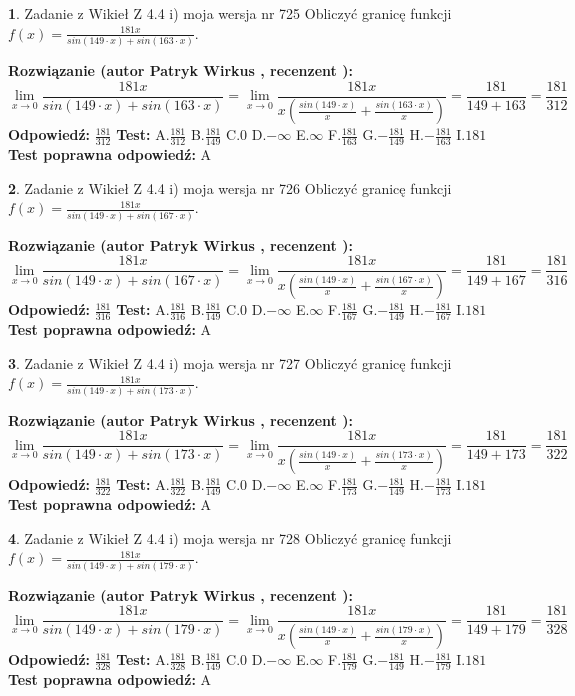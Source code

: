 \documentclass[12pt, a4paper]{article}
\theoremstyle{definition} %
\newtheorem{zad}{}
\newcommand{\zadStart}[1]{\begin{zad}#1\newline}
\newcommand{\zadStop}{\end{zad}}
\newcommand{\rozwStart}[2]{\noindent \textbf{Rozwiązanie (autor #1 , recenzent #2): }\newline}
\newcommand{\rozwStop}{\newline}
\newcommand{\odpStart}{\noindent \textbf{Odpowiedź:}\newline}
\newcommand{\odpStop}{\newline}
\newcommand{\testStart}{\noindent \textbf{Test:}\newline}
\newcommand{\testStop}{\newline}
\newcommand{\kluczStart}{\noindent \textbf{Test poprawna odpowiedź:}\newline}
\newcommand{\kluczStop}{\newline}
\begin{document}
\zadStart{Zadanie z Wikieł Z 4.4 i) moja wersja nr 725}
Obliczyć granicę funkcji $f(x)=\frac{181x}{sin(149\cdot x) +sin(163\cdot x)}$.
\zadStop
\rozwStart{Patryk Wirkus}{}
$$\lim\limits_{x\to 0}\frac{181x}{sin(149\cdot x) +sin(163\cdot x)}=\lim\limits_{x\to 0}\frac{181x}{x(\frac{sin(149\cdot x)}{x}+\frac{sin(163\cdot x)}{x})}=\frac{181}{149+163} = \frac{181}{312}$$
\rozwStop
\odpStart
$\frac{181}{312}$
\odpStop
\testStart
A.$\frac{181}{312}$
B.$\frac{181}{149}$
C.$0$
D.$-\infty$
E.$\infty$
F.$\frac{181}{163}$
G.$-\frac{181}{149}$
H.$-\frac{181}{163}$
I.$181$
\testStop
\kluczStart
A
\kluczStop



\zadStart{Zadanie z Wikieł Z 4.4 i) moja wersja nr 726}
Obliczyć granicę funkcji $f(x)=\frac{181x}{sin(149\cdot x) +sin(167\cdot x)}$.
\zadStop
\rozwStart{Patryk Wirkus}{}
$$\lim\limits_{x\to 0}\frac{181x}{sin(149\cdot x) +sin(167\cdot x)}=\lim\limits_{x\to 0}\frac{181x}{x(\frac{sin(149\cdot x)}{x}+\frac{sin(167\cdot x)}{x})}=\frac{181}{149+167} = \frac{181}{316}$$
\rozwStop
\odpStart
$\frac{181}{316}$
\odpStop
\testStart
A.$\frac{181}{316}$
B.$\frac{181}{149}$
C.$0$
D.$-\infty$
E.$\infty$
F.$\frac{181}{167}$
G.$-\frac{181}{149}$
H.$-\frac{181}{167}$
I.$181$
\testStop
\kluczStart
A
\kluczStop



\zadStart{Zadanie z Wikieł Z 4.4 i) moja wersja nr 727}
Obliczyć granicę funkcji $f(x)=\frac{181x}{sin(149\cdot x) +sin(173\cdot x)}$.
\zadStop
\rozwStart{Patryk Wirkus}{}
$$\lim\limits_{x\to 0}\frac{181x}{sin(149\cdot x) +sin(173\cdot x)}=\lim\limits_{x\to 0}\frac{181x}{x(\frac{sin(149\cdot x)}{x}+\frac{sin(173\cdot x)}{x})}=\frac{181}{149+173} = \frac{181}{322}$$
\rozwStop
\odpStart
$\frac{181}{322}$
\odpStop
\testStart
A.$\frac{181}{322}$
B.$\frac{181}{149}$
C.$0$
D.$-\infty$
E.$\infty$
F.$\frac{181}{173}$
G.$-\frac{181}{149}$
H.$-\frac{181}{173}$
I.$181$
\testStop
\kluczStart
A
\kluczStop



\zadStart{Zadanie z Wikieł Z 4.4 i) moja wersja nr 728}
Obliczyć granicę funkcji $f(x)=\frac{181x}{sin(149\cdot x) +sin(179\cdot x)}$.
\zadStop
\rozwStart{Patryk Wirkus}{}
$$\lim\limits_{x\to 0}\frac{181x}{sin(149\cdot x) +sin(179\cdot x)}=\lim\limits_{x\to 0}\frac{181x}{x(\frac{sin(149\cdot x)}{x}+\frac{sin(179\cdot x)}{x})}=\frac{181}{149+179} = \frac{181}{328}$$
\rozwStop
\odpStart
$\frac{181}{328}$
\odpStop
\testStart
A.$\frac{181}{328}$
B.$\frac{181}{149}$
C.$0$
D.$-\infty$
E.$\infty$
F.$\frac{181}{179}$
G.$-\frac{181}{149}$
H.$-\frac{181}{179}$
I.$181$
\testStop
\kluczStart
A
\kluczStop
\end{document}
